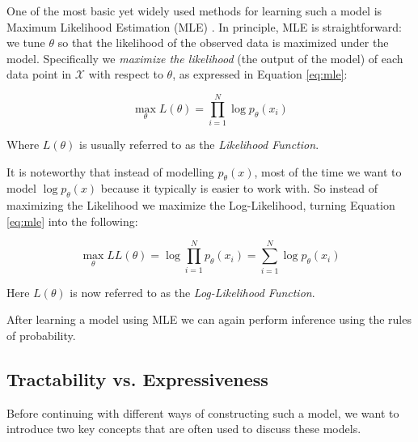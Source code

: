 One of the most basic yet widely used methods for learning such a model is Maximum Likelihood Estimation (MLE) \cite{ml_book}. 
In principle, MLE is straightforward: we tune $\theta$ so that the likelihood of the observed data is maximized under the model.
Specifically we \emph{maximize the likelihood} (the output of the model) of each data point in $\mathcal{X}$ with respect to $\theta$, as 
expressed in Equation \ref{eq:mle}: 

\begin{equation}
    \max_{\theta} L(\theta) = \prod_{i=1}^{N} \log p_\theta(x_i)
    \label{eq:mle}
\end{equation}

Where $L(\theta)$ is usually referred to as the \emph{Likelihood Function}.

It is noteworthy that instead of modelling $p_\theta(x)$, most of the time we want to model $\log p_\theta(x)$ because it typically is easier to work with. 
So instead of maximizing the Likelihood we maximize the Log-Likelihood, turning Equation \ref{eq:mle} into the following:

\begin{equation}
    \max_{\theta} LL(\theta) = \log \prod_{i=1}^{N} p_\theta(x_i) = \sum_{i=1}^{N} \log p_\theta(x_i)
    \label{eq:log_mle}
\end{equation}

Here $L(\theta)$ is now referred to as the \emph{Log-Likelihood Function}. 

After learning a model using MLE we can again perform inference using the rules of probability. 

\subsection{Tractability vs. Expressiveness}

Before continuing with different ways of constructing such a model, we want to introduce two key concepts that are often 
used to discuss these models. 


